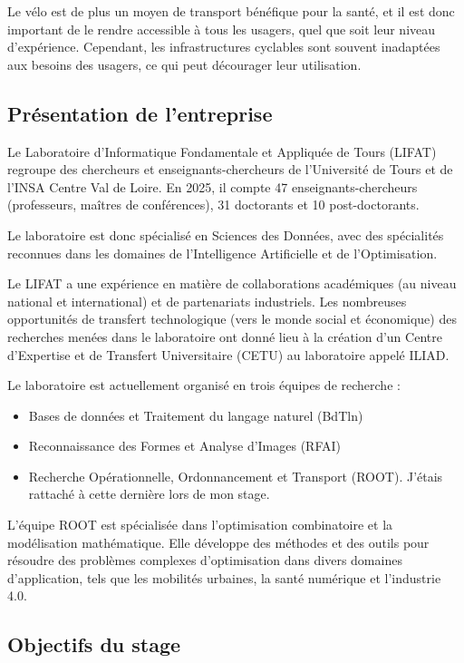 \documentclass[a4paper,12pt,french]{article}
\begin{document}
Le vélo est de plus un moyen de transport bénéfique pour la santé, et il est donc important de le rendre accessible à tous les usagers, quel que soit leur niveau d'expérience. Cependant, les infrastructures cyclables sont souvent inadaptées aux besoins des usagers, ce qui peut décourager leur utilisation.

\subsection{Présentation de l'entreprise}

Le Laboratoire d'Informatique Fondamentale et Appliquée de Tours (LIFAT) \cite{lifat} regroupe des chercheurs et enseignants-chercheurs de l'Université de Tours et de l'INSA Centre Val de Loire. En 2025, il compte 47 enseignants-chercheurs (professeurs, maîtres de conférences), 31 doctorants et 10 post-doctorants.

Le laboratoire est donc spécialisé en Sciences des Données, avec des spécialités reconnues dans les domaines de l'Intelligence Artificielle et de l'Optimisation.

Le LIFAT a une expérience en matière de collaborations académiques (au niveau national et international) et de partenariats industriels. Les nombreuses opportunités de transfert technologique (vers le monde social et économique) des recherches menées dans le laboratoire ont donné lieu à la création d'un Centre d'Expertise et de Transfert Universitaire (CETU) au laboratoire appelé ILIAD.

Le laboratoire est actuellement organisé en trois équipes de recherche :

\begin{itemize}
    \item Bases de données et Traitement du langage naturel (BdTln)
    \item Reconnaissance des Formes et Analyse d'Images (RFAI)
    \item Recherche Opérationnelle, Ordonnancement et Transport (ROOT). J'étais rattaché à cette dernière lors de mon stage.
\end{itemize}

L'équipe ROOT est spécialisée dans l'optimisation combinatoire et la modélisation mathématique. Elle développe des méthodes et des outils pour résoudre des problèmes complexes d'optimisation dans divers domaines d'application, tels que les mobilités urbaines, la santé numérique et l'industrie 4.0.

\subsection{Objectifs du stage}
\end{document}
